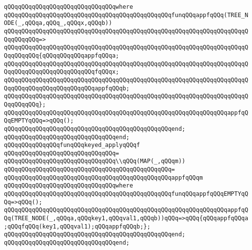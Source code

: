 \verb|qQQqqQQqqQQqqQQqqQQqqQQqqQQqqQQqwhere|\newline
\verb|qQQqqQQqqQQqqQQqqQQqqQQqqQQqqQQqqQQqqQQqqQQqqQQqfunqQQqappfqQQq(TREE_NODE(_,qQQqa,qQQq_,qQQqx,qQQqb))|\newline
\verb|qQQqqQQqqQQqqQQqqQQqqQQqqQQqqQQqqQQqqQQqqQQqqQQqqQQqqQQqqQQqqQQqqQQqqQQqqQQqqQQq=>|\newline
\verb|qQQqqQQqqQQqqQQqqQQqqQQqqQQqqQQqqQQqqQQqqQQqqQQqqQQqqQQqqQQqqQQqqQQqqQQqqQQqqQQq{qQQqqQQqqQQqappfqQQqa;|\newline
\verb|qQQqqQQqqQQqqQQqqQQqqQQqqQQqqQQqqQQqqQQqqQQqqQQqqQQqqQQqqQQqqQQqqQQqqQQqqQQqqQQqqQQqqQQqqQQqqQQqfqQQqx;|\newline
\verb|qQQqqQQqqQQqqQQqqQQqqQQqqQQqqQQqqQQqqQQqqQQqqQQqqQQqqQQqqQQqqQQqqQQqqQQqqQQqqQQqqQQqqQQqqQQqqQQqappfqQQqb;|\newline
\verb|qQQqqQQqqQQqqQQqqQQqqQQqqQQqqQQqqQQqqQQqqQQqqQQqqQQqqQQqqQQqqQQqqQQqqQQqqQQqqQQq};|\newline
\newline
\verb|qQQqqQQqqQQqqQQqqQQqqQQqqQQqqQQqqQQqqQQqqQQqqQQqqQQqqQQqqQQqqQQqappfqQQqEMPTYqQQq=>qQQq();|\newline
\verb|qQQqqQQqqQQqqQQqqQQqqQQqqQQqqQQqqQQqqQQqqQQqqQQqend;|\newline
\verb|qQQqqQQqqQQqqQQqqQQqqQQqqQQqqQQqend;|\newline
\newline
\verb|qQQqqQQqqQQqqQQqfunqQQqkeyed_applyqQQqf|\newline
\verb|qQQqqQQqqQQqqQQqqQQqqQQqqQQqqQQq=|\newline
\verb|qQQqqQQqqQQqqQQqqQQqqQQqqQQqqQQq\\qQQq(MAP(_,qQQqm))|\newline
\verb|qQQqqQQqqQQqqQQqqQQqqQQqqQQqqQQqqQQqqQQqqQQqqQQq=|\newline
\verb|qQQqqQQqqQQqqQQqqQQqqQQqqQQqqQQqqQQqqQQqqQQqqQQqappfqQQqm|\newline
\verb|qQQqqQQqqQQqqQQqqQQqqQQqqQQqqQQqwhere|\newline
\verb|qQQqqQQqqQQqqQQqqQQqqQQqqQQqqQQqqQQqqQQqqQQqqQQqfunqQQqappfqQQqEMPTYqQQq=>qQQq();|\newline
\verb|qQQqqQQqqQQqqQQqqQQqqQQqqQQqqQQqqQQqqQQqqQQqqQQqqQQqqQQqqQQqqQQqappfqQQq(TREE_NODE(_,qQQqa,qQQqkey1,qQQqval1,qQQqb))qQQq=>qQQq{qQQqappfqQQqa;qQQqfqQQq(key1,qQQqval1);qQQqappfqQQqb;};|\newline
\verb|qQQqqQQqqQQqqQQqqQQqqQQqqQQqqQQqqQQqqQQqqQQqqQQqend;|\newline
\verb|qQQqqQQqqQQqqQQqqQQqqQQqqQQqqQQqend;|\newline
